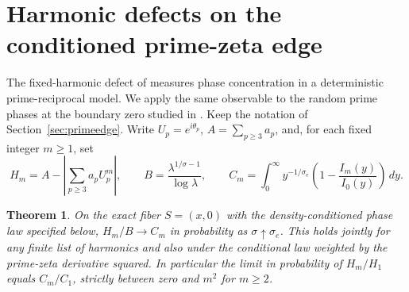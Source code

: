 \documentclass[11pt]{article}
\newtheorem{theorem}{Theorem}[section]
\begin{document}
\section{Harmonic defects on the conditioned prime-zeta edge}
\label{sec:edge-harmonics}

The fixed-harmonic defect of \cite{vm149} measures phase concentration
in a deterministic prime-reciprocal model. We apply the same observable
to the random prime phases at the boundary zero studied in
\cite{vm004}. Keep the notation of Section~\ref{sec:primeedge}. Write
$U_p=e^{i\theta_p}$, $A=\sum_{p\ge3}a_p$, and, for each fixed integer
$m\ge1$, set
\[
 H_m=A-\left|\sum_{p\ge3}a_pU_p^m\right|,\qquad
 B=\frac{\lambda^{1/\sigma-1}}{\log\lambda},\qquad
 C_m=\int_0^\infty y^{-1/\sigma_e}
             \left(1-\frac{I_m(y)}{I_0(y)}\right)\,dy .
\]

\begin{theorem}
On the exact fiber $S=(x,0)$ with the density-conditioned phase law
specified below, $H_m/B\to C_m$ in probability as
$\sigma\uparrow\sigma_e$. This holds jointly for any finite list of
harmonics and also under the conditional law weighted by the
prime-zeta derivative squared. In particular the limit in probability
of $H_m/H_1$ equals $C_m/C_1$, strictly between zero and $m^2$
for $m\ge2$.
\end{theorem}
\end{document}
